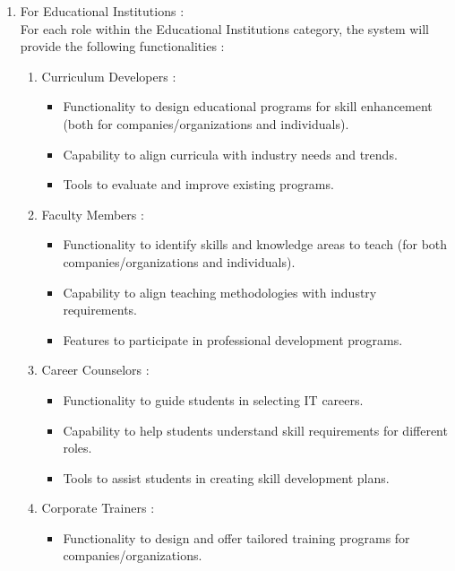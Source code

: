 \begin{enumerate}
          \item For Educational Institutions : \\   
    For each role within the Educational Institutions category, the system will provide the following functionalities :
    \begin{enumerate}
        \item Curriculum Developers : \\
        \begin{itemize}
          \renewcommand\labelitemi{-}
          \item Functionality to design educational programs for skill enhancement (both for companies/organizations and individuals).
          \item Capability to align curricula with industry needs and trends.
          \item Tools to evaluate and improve existing programs.
        \end{itemize}
        \item Faculty Members : \\
        \begin{itemize}
          \renewcommand\labelitemi{-}
          \item Functionality to identify skills and knowledge areas to teach (for both companies/organizations and individuals).
          \item Capability to align teaching methodologies with industry requirements.
          \item Features to participate in professional development programs.
        \end{itemize}
        \item Career Counselors : \\
        \begin{itemize}
          \renewcommand\labelitemi{-}
          \item Functionality to guide students in selecting IT careers.
          \item Capability to help students understand skill requirements for different roles.
          \item Tools to assist students in creating skill development plans.
        \end{itemize}
        \newpage
        \item Corporate Trainers : \\
        \begin{itemize}
          \renewcommand\labelitemi{-}
          \item Functionality to design and offer tailored training programs for companies/organizations.

\end{itemize}
\end{enumerate}
\end{enumerate}
